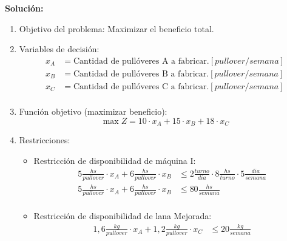 \documentclass[../main.tex]{subfiles}
\begin{document}
\begin{exercise}
            \textbf{Solución:}
            \begin{enumerate}
                \item Objetivo del problema: Maximizar el beneficio total.
                \item Variables de decisión:
                    \begin{equation}
                        \begin{split}
                            x_A &= \text{Cantidad de pullóveres A a fabricar.} [pullover/semana] \\
                            x_B &= \text{Cantidad de pullóveres B a fabricar.} [pullover/semana] \\
                            x_C &= \text{Cantidad de pullóveres C a fabricar.} [pullover/semana]\\
                        \end{split}
                    \end{equation}
                \item Función objetivo (maximizar beneficio):
                    \begin{equation}
                        \max Z = 10 \cdot x_A + 15 \cdot x_B + 18 \cdot x_C
                    \end{equation}
                \item Restricciones:
                    \begin{itemize}
                        \item Restricción de disponibilidad de máquina I:
                            \begin{equation}
                                \begin{aligned}
                                    5 \frac{hs}{pullover} \cdot x_A + 6 \frac{hs}{pullover} \cdot x_B &\leq 2 \frac{turno}{dia} \cdot 8 \frac{hs}{turno} \cdot 5 \frac{dia}{semana} \\
                                    5 \frac{hs}{pullover} \cdot x_A + 6 \frac{hs}{pullover} \cdot x_B &\leq 80 \frac{hs}{semana} \\
                                \end{aligned}
                            \end{equation}
                        \item Restricción de disponibilidad de lana Mejorada:
                            \begin{equation}
                                \begin{aligned}
                                    1,6 \frac{kg}{pullover} \cdot x_A + 1,2 \frac{kg}{pullover} \cdot x_C &\leq 20 \frac{kg}{semana} \\
                                \end{aligned}
                            \end{equation}
                    \end{itemize}


\end{enumerate}
\end{exercise}
\end{document}

